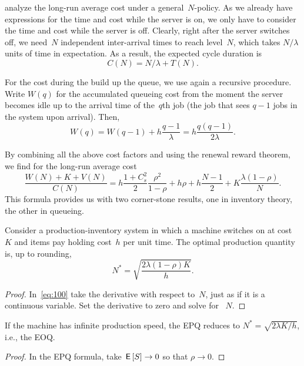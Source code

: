 \documentclass[queueing-book.tex]{subfiles}
\begin{document}
 analyze the long-run average cost under a general~$N$-policy.
As we already have expressions for the time and cost while the server is on, we only have to consider the time and cost while the server is off.
Clearly, right after the server switches off, we need~$N$ independent inter-arrival times to reach level~$N$, which takes $N/\lambda$ units of time in expectation.
As a result, the expected cycle duration is
\begin{equation*}
C(N) = N/\lambda + T(N).
\end{equation*}


For the cost during the build up the queue, we use again a recursive procedure.
Write $W(q)$ for the accumulated queueing cost
from the moment the server becomes idle up to the arrival time of the~$q$th job (the job that sees $q-1$ jobs in the system upon arrival).
Then,
\begin{equation*}
  W(q) = W(q-1) +  h\frac{q-1}{\lambda}= h \frac{q(q-1)}{2\lambda}.
\end{equation*}

By combining all the above cost factors and using the renewal reward theorem, we find for the long-run average cost
\begin{equation}  \label{eq:100}
    \frac{W(N) + K + V(N)}{C(N)}
    = h \frac{1+ C_s^2}2 \frac{\rho^2}{1-\rho} + h \rho + h \frac{N-1}2 + K \frac{\lambda(1-\rho)}N.
\end{equation}
This formula provides us with two corner-stone results, one in inventory theory, the other in queueing.

\begin{theorem}
Consider a production-inventory system in which a machine switches on at cost~$K$ and items pay holding cost~$h$ per unit time.
The optimal production quantity is,  up to rounding,
\begin{equation*}
  N^* = \sqrt{\frac{2\lambda(1-\rho)K}{h}}.
\end{equation*}
\end{theorem}
\begin{proof}
In~\cref{eq:100} take the derivative with respect to~$N$, just as if it is a continuous variable.
Set the derivative to zero and solve for ~$N$.
\end{proof}

\begin{corollary}
If the machine has infinite production speed, the EPQ reduces to $N^{*} = \sqrt{2\lambda K/h}$, i.e., the EOQ.
\end{corollary}
\begin{proof}
In the EPQ formula,  take $\,\mathsf{E}\left[S\right] \to 0$ so that $\rho \to 0$.
\end{proof}
\end{document}
